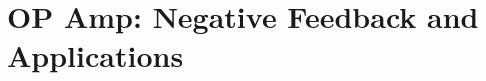 \documentclass[../course]{subfiles}
\begin{document}
\chapter{OP Amp: Negative Feedback and Applications}


\end{document}
